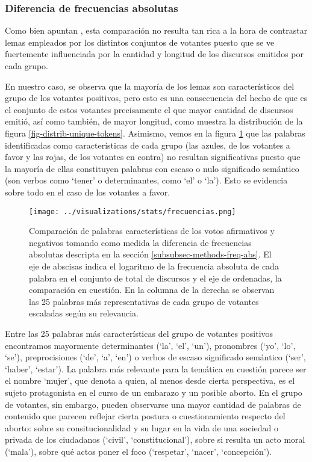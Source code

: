 \subsubsection{Diferencia de frecuencias absolutas}
Como bien apuntan \cite{monroe2008fightin}, esta comparaci\'on no resulta tan rica
a la hora de contrastar lemas empleados por los distintos conjuntos de
votantes puesto que se ve fuertemente influenciada por la cantidad y longitud
de los discursos emitidos por cada grupo.
\par
En nuestro caso, se observa que la mayor\'ia de los lemas son caracter\'isticos
del grupo de los votantes positivos, pero esto es una consecuencia del hecho
de que es el conjunto de estos votantes precisamente el que mayor cantidad de
discursos emiti\'o, as\'i como tambi\'en, de mayor longitud, como muestra la distribuci\'on
de la figura \ref{fig-distrib-unique-tokens}. Asimismo, vemos en la figura
\ref{fig-statistics-freq-abs} que las palabras identificadas como caracter\'isticas
de cada grupo (las azules, de los votantes a favor y las rojas, de los votantes
en contra) no resultan significativas puesto que la mayor\'ia de ellas constituyen
palabras con escaso o nulo significado sem\'antico (son verbos como `tener' o
determinantes, como `el' o `la'). Esto se evidencia sobre todo en el caso de
los votantes a favor.

\begin{figure}[h!]
    \centering
    \texttt{[image: ../visualizations/stats/frecuencias.png]}
    \caption{Comparaci\'on de palabras caracter\'isticas de los votos afirmativos y
    negativos tomando como medida la diferencia de frecuencias absolutas descripta
    en la secci\'on \ref{subsubsec-methods-freq-abs}. El eje de abscisas indica el
    logaritmo de la frecuencia absoluta de cada palabra en el conjunto de total
    de discursos y el eje de ordenadas, la comparaci\'on en cuesti\'on. En la
    columna de la derecha se observan las 25 palabras m\'as representativas de
    cada grupo de votantes escaladas seg\'un su relevancia.}
    \label{fig-statistics-freq-abs}
\end{figure}

Entre las 25 palabras m\'as caracter\'isticas del grupo de votantes positivos
encontramos mayormente determinantes (`la', `el', `un'), pronombres 
(`yo', `lo', `se'), preprocisiones (`de', `a', `en') o verbos de escaso
significado sem\'antico (`ser', `haber', `estar'). La palabra m\'as relevante
para la tem\'atica en cuesti\'on parece ser el nombre `mujer', que denota a
quien, al menos desde cierta perspectiva, es el
sujeto protagonista en el curso de un embarazo y un posible aborto. En el grupo
de votantes, sin embargo, pueden observarse una mayor cantidad de palabras
de contenido que parecen reflejar cierta
postura o cuestionamiento respecto del aborto: sobre su consitucionalidad
y su lugar en la vida de una sociedad o privada de los ciudadanos
(`civil', `constitucional'), sobre si resulta un acto moral (`mala'),
sobre qu\'e actos poner el foco (`respetar', `nacer', `concepci\'on').

